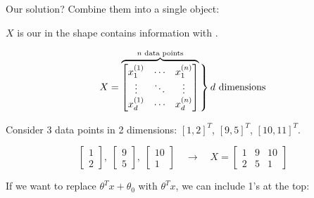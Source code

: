         Our solution? Combine them into a single object:\\

        \begin{kequation}
            $X$ is our  in the shape  contains information  with .
            
            \begin{equation*}
                X = 
                    \overbrace{
                        \begin{bmatrix}
                            \ex{x_1}{1} & \cdots  & \ex{x_1}{n} \\
                            \vdots      & \ddots & \vdots      \\
                            \ex{x_d}{1} & \cdots  & \ex{x_d}{n}
                        \end{bmatrix}
                        }^{ n \text{ data points}}
                    \bigggrB{50pt} d \text{ dimensions}
            \end{equation*}

        \end{kequation}

        \miniex Consider 3 data points in 2 dimensions: $[1,2]^T$, $[9,5]^T$, $[10,11]^T$.

        \begin{equation}
            \begin{bmatrix}
                1 \\ 2
            \end{bmatrix}, \;
            \begin{bmatrix}
                9 \\ 5
            \end{bmatrix}, \; 
            \begin{bmatrix}
                10 \\ 1
            \end{bmatrix}
            \quad \longrightarrow \quad 
            X = 
            \begin{bmatrix}
                1 & 9 & 10 \\
                2 & 5 & 1
            \end{bmatrix}
        \end{equation}

        If we want to replace $\theta^Tx +\theta_0$ with $\theta^Tx$, we can include 1's at the top:

